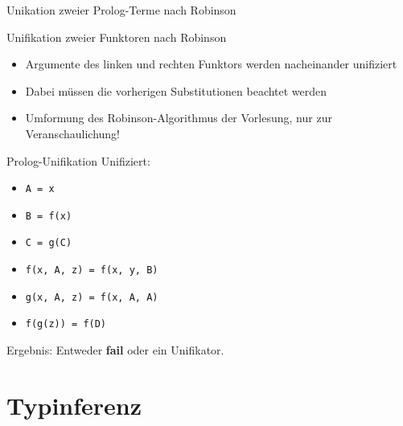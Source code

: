 \documentclass{beamer}
\newcommand{\code}[1]{
	\begin{mdframed}
		
	\end{mdframed}
}
\begin{document}
\begin{frame}{Unikation zweier Prolog-Terme nach Robinson}
	\code{code/robinson.pseudo}
\end{frame}

\begin{frame}{Unifikation zweier Funktoren nach Robinson}
	\code{code/robinson2.pseudo}

	\begin{itemize}
		\item Argumente des linken und rechten Funktors werden nacheinander unifiziert
		\item Dabei müssen die vorherigen Substitutionen beachtet werden
		\pause
		\item Umformung des Robinson-Algorithmus der Vorlesung, nur zur Veranschaulichung!
	\end{itemize}
\end{frame}

\begin{frame}{Prolog-Unifikation}
	Unifiziert:

	\begin{itemize}
		\item \texttt{A = x}
		\item \texttt{B = f(x)}
		\item \texttt{C = g(C)}
		\item \texttt{f(x, A, z) = f(x, y, B)}
		\item \texttt{g(x, A, z) = f(x, A, A)}
		\item \texttt{f(g(z)) = f(D)}
	\end{itemize}

	Ergebnis: Entweder \textbf{fail} oder ein Unifikator.
\end{frame}

\section{Typinferenz}

\newcommand{\aeq}{\stackrel{\alpha}{=}}
\newcommand{\naeq}{\stackrel{\alpha}{\neq}}
\newcommand{\eeq}{\stackrel{\eta}{=}}

\newcommand{\E}{\;}

\newcommand{\liin}[2]{#1\E{}#2}
\newcommand{\liiin}[3]{#1\E{}#2\E{}#3}
\newcommand{\livn}[4]{#1\E{}#2\E{}#3\E{}#4}
\newcommand{\lvn}[5]{#1\E{}#2\E{}#3\E{}#4\E{}#5}

\newcommand{\lii}[2]{(#1\E{}#2)}
\newcommand{\liii}[3]{(#1\E{}#2\E{}#3)}

\newcommand{\liir}[2]{\textcolor{red}{\underline{(}}#1\E{}#2\textcolor{red}{\underline{)}}}
\newcommand{\liiir}[3]{\textcolor{red}{\underline{(}}#1\E{}#2\E{}#3\textcolor{red}{\underline{)}}}
\end{document}
